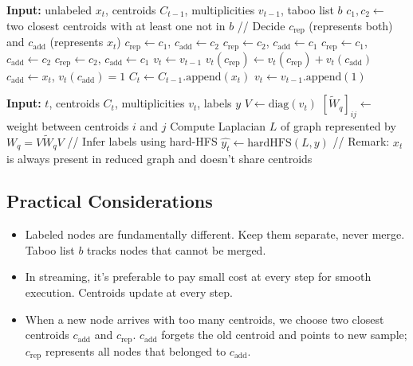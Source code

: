 \documentclass[11pt]{article}
\begin{document}
\begin{algorithm}[H]
	\begin{algorithmic}[1]
		{\small
			\STATE  \textbf{Input:} unlabeled $x_t$, centroids $C_{t - 1}$, multiplicities $v_{t-1}$, taboo list $b$
				\STATE $c_1, c_2 \gets $ two closest centroids with at least one not in $b$
				\STATE // Decide $c_{\text{rep}}$ (represents both) and $c_{\text{add}}$ (represents $x_t$)
					\STATE $c_{\text{rep}} \gets c_1$, $c_{\text{add}} \gets c_2$
					\STATE $c_{\text{rep}} \gets c_2$, $c_{\text{add}} \gets c_1$
					\STATE $c_{\text{rep}} \gets c_1$, $c_{\text{add}} \gets c_2$
				\ELSE
					\STATE $c_{\text{rep}} \gets c_2$, $c_{\text{add}} \gets c_1$
				\ENDIF
				\STATE $v_t \gets v_{t-1}$
				\STATE $v_t(c_{\text{rep}}) \gets v_t(c_{\text{rep}}) + v_t(c_{\text{add}})$
				\STATE $c_{\text{add}} \gets x_t$, $v_t(c_{\text{add}}) = 1$
			\ELSE
				\STATE  $C_t \gets C_{t - 1}.\text{append}(x_t)$
				\STATE  $v_t \gets v_{t-1}.\text{append}(1)$
			\ENDIF
		}
	\end{algorithmic}
	\caption{Incremental $k$-centers}
\end{algorithm}

\begin{algorithm}[H]
	\begin{algorithmic}[1]
		\STATE  \textbf{Input:} $t$, centroids $C_t$, multiplicities $v_t$, labels $y$
		\STATE $V \gets \text{diag}(v_t)$
		\STATE $[\widetilde{W}_q]_{ij} \gets$ weight between centroids $i$ and $j$
		\STATE Compute Laplacian $L$ of graph represented by $W_q = V\widetilde{W}_qV$
		\STATE  // Infer labels using hard-HFS
		\STATE $\widehat{y_t} \gets \text{hardHFS}(L, y)$
		\STATE // Remark: $x_t$ is always present in reduced graph and doesn't share centroids
	\end{algorithmic}
	\caption{Online HFS with Graph Quantization}
\end{algorithm}

\subsection{Practical Considerations}

\begin{infobox}
\begin{itemize}[leftmargin=*]
	\item Labeled nodes are fundamentally different. Keep them separate, never merge.
	      Taboo list $b$ tracks nodes that cannot be merged.
	\item In streaming, it's preferable to pay small cost at every step
	      for smooth execution. Centroids update at every step.
	\item When a new node arrives with too many centroids, we choose
	      two closest centroids $c_{\text{add}}$ and $c_{\text{rep}}$.
	      $c_{\text{add}}$ forgets the old centroid and points to new sample;
	      $c_{\text{rep}}$ represents all nodes that belonged to $c_{\text{add}}$.
\end{itemize}
\end{infobox}
\end{document}
